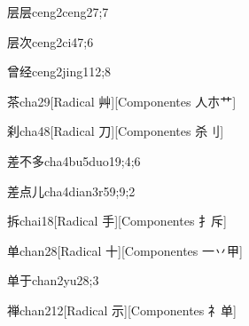 \begin{verbete}{层层}{ceng2ceng2}{7;7}
\end{verbete}

\begin{verbete}{层次}{ceng2ci4}{7;6}
\end{verbete}

\begin{verbete}{曾经}{ceng2jing1}{12;8}
\end{verbete}

\begin{verbete}{茶}{cha2}{9}[Radical 艸][Componentes 人朩艹]
\end{verbete}

\begin{verbete}{刹}{cha4}{8}[Radical 刀][Componentes 杀⺉]
\end{verbete}

\begin{verbete}{差不多}{cha4bu5duo1}{9;4;6}
\end{verbete}

\begin{verbete}{差点儿}{cha4dian3r5}{9;9;2}
\end{verbete}

\begin{verbete}{拆}{chai1}{8}[Radical 手][Componentes ⺘斥]
\end{verbete}

\begin{verbete}{单}{chan2}{8}[Radical 十][Componentes 一丷甲]
\end{verbete}

\begin{verbete}{单于}{chan2yu2}{8;3}
\end{verbete}

\begin{verbete}{禅}{chan2}{12}[Radical 示][Componentes 礻单]
\end{verbete}

